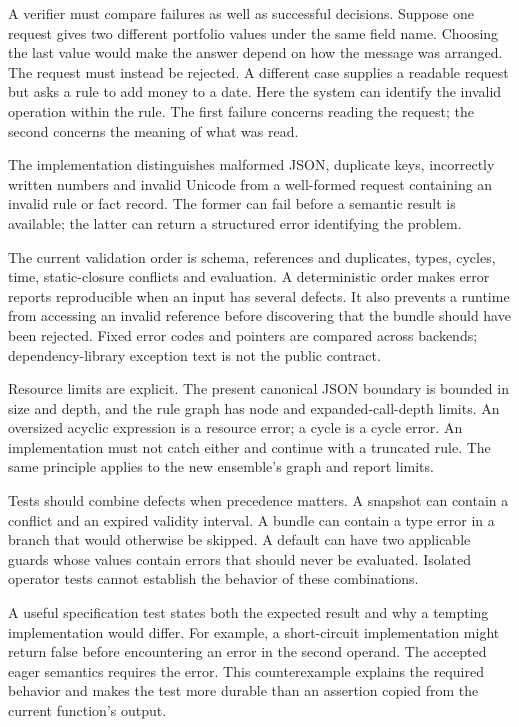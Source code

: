 A verifier must compare failures as well as successful decisions. Suppose one
request gives two different portfolio values under the same field name. Choosing
the last value would make the answer depend on how the message was arranged.
The request must instead be rejected. A different case supplies a readable
request but asks a rule to add money to a date. Here the system can identify the
invalid operation within the rule. The first failure concerns reading the
request; the second concerns the meaning of what was read.

The implementation distinguishes malformed JSON, duplicate keys, incorrectly
written numbers and invalid Unicode from a well-formed request containing an
invalid rule or fact record. The former can fail before a semantic result is
available; the latter can return a structured error identifying the problem.

The current validation order is schema, references and duplicates, types, cycles,
time, static-closure conflicts and evaluation. A deterministic order makes error
reports reproducible when an input has several defects. It also prevents a
runtime from accessing an invalid reference before discovering that the bundle
should have been rejected. Fixed error codes and pointers are compared across
backends; dependency-library exception text is not the public contract.


Resource limits are explicit. The present canonical JSON boundary is bounded in
size and depth, and the rule graph has node and expanded-call-depth limits. An
oversized acyclic expression is a resource error; a cycle is a cycle error. An
implementation must not catch either and continue with a truncated rule. The
same principle applies to the new ensemble's graph and report limits.

Tests should combine defects when precedence matters. A snapshot can contain a
conflict and an expired validity interval. A bundle can contain a type error in a
branch that would otherwise be skipped. A default can have two applicable guards
whose values contain errors that should never be evaluated. Isolated operator
tests cannot establish the behavior of these combinations.

A useful specification test states both the expected result and why a tempting
implementation would differ. For example, a short-circuit implementation might
return false before encountering an error in the second operand. The accepted
eager semantics requires the error. This counterexample explains the required behavior and
makes the test more durable than an assertion copied from the current function's
output.

